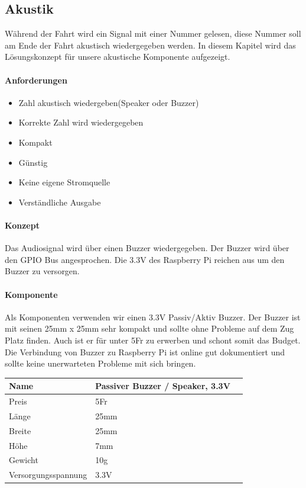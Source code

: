 \documentclass[../../main.tex]{subfiles}
\begin{document}
\subsection{Akustik}
Während der Fahrt wird ein Signal mit einer Nummer gelesen, diese Nummer soll am Ende der Fahrt akustisch wiedergegeben werden. In diesem Kapitel wird das Lösungskonzept für unsere akustische Komponente aufgezeigt.

\paragraph{Anforderungen}
\begin{itemize}
    \item Zahl akustisch wiedergeben(Speaker oder Buzzer)
    \item Korrekte Zahl wird wiedergegeben
    \item Kompakt
    \item Günstig
    \item Keine eigene Stromquelle
    \item Verständliche Ausgabe
\end{itemize}

\paragraph{Konzept}
Das Audiosignal wird über einen Buzzer wiedergegeben. Der Buzzer wird über den GPIO Bus angesprochen. Die 3.3V des Raspberry Pi reichen aus um den Buzzer zu versorgen.

\paragraph{Komponente}
Als Komponenten verwenden wir einen 3.3V Passiv/Aktiv Buzzer. Der Buzzer ist mit seinen 25mm x 25mm sehr kompakt und sollte ohne Probleme auf dem Zug Platz finden. Auch ist er für unter 5Fr zu erwerben und schont somit das Budget. Die Verbindung von Buzzer zu Raspberry Pi ist online gut dokumentiert und sollte keine unerwarteten Probleme mit sich bringen.

\begin{table}[H]
\begin{flushleft}
\begin{tabular}{lll}
Name & Passiver Buzzer / Speaker, 3.3V \\ \hline
Preis & 5Fr     \\ \hline
Länge & 25mm    \\ \hline
Breite & 25mm   \\ \hline
Höhe & 7mm      \\ \hline
Gewicht & 10g   \\ \hline
Versorgungsspannung & 3.3V \\ \hline
\end{tabular}
\end{flushleft}
\end{table}
\end{document}
